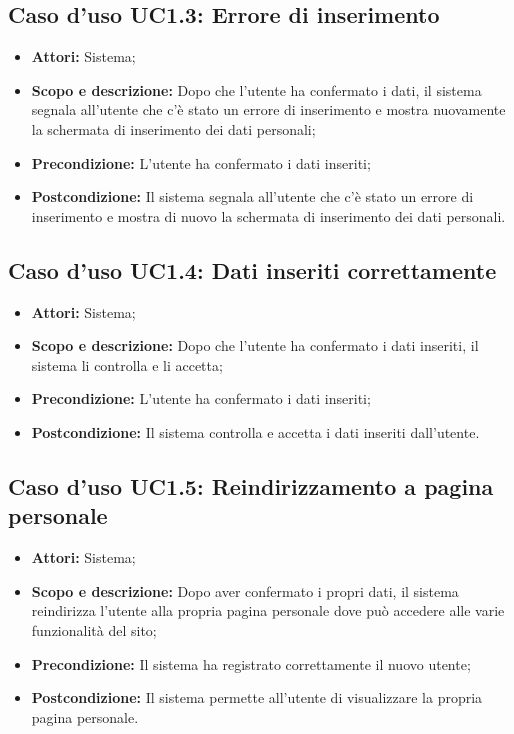 \subsection{Caso d'uso UC1.3: Errore di inserimento}
\begin{itemize}
	\item \textbf{Attori:} Sistema;
	\item \textbf{Scopo e descrizione:} Dopo che l'utente ha confermato i dati, il sistema segnala all'utente che c'è stato un errore di inserimento e mostra nuovamente la schermata di inserimento dei dati personali;
	\item \textbf{Precondizione:} L'utente ha confermato i dati inseriti;
	\item \textbf{Postcondizione:} Il sistema segnala all'utente che c'è stato un errore di inserimento e mostra di nuovo la schermata di inserimento dei dati personali.
\end{itemize}

\subsection{Caso d'uso UC1.4: Dati inseriti correttamente}
\begin{itemize}
	\item \textbf{Attori:} Sistema;
	\item \textbf{Scopo e descrizione:} Dopo che l'utente ha confermato i dati inseriti, il sistema li controlla e li accetta;
	\item \textbf{Precondizione:} L'utente ha confermato i dati inseriti;
	\item \textbf{Postcondizione:} Il sistema controlla e accetta i dati inseriti dall'utente.
\end{itemize}

\subsection{Caso d'uso UC1.5: Reindirizzamento a pagina personale}
\begin{itemize}
	\item \textbf{Attori:} Sistema;
	\item \textbf{Scopo e descrizione:} Dopo aver confermato i propri dati, il sistema reindirizza l'utente alla propria pagina personale dove può accedere alle varie funzionalità del sito;
	\item \textbf{Precondizione:} Il sistema ha registrato correttamente il nuovo utente;
	\item \textbf{Postcondizione:} Il sistema permette all'utente di visualizzare la propria pagina personale.
\end{itemize}